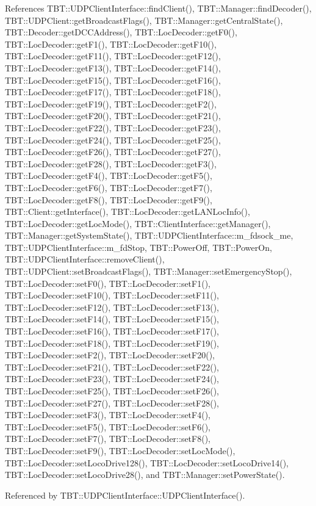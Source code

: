 References T\+B\+T\+::\+U\+D\+P\+Client\+Interface\+::find\+Client(), T\+B\+T\+::\+Manager\+::find\+Decoder(), T\+B\+T\+::\+U\+D\+P\+Client\+::get\+Broadcast\+Flags(), T\+B\+T\+::\+Manager\+::get\+Central\+State(), T\+B\+T\+::\+Decoder\+::get\+D\+C\+C\+Address(), T\+B\+T\+::\+Loc\+Decoder\+::get\+F0(), T\+B\+T\+::\+Loc\+Decoder\+::get\+F1(), T\+B\+T\+::\+Loc\+Decoder\+::get\+F10(), T\+B\+T\+::\+Loc\+Decoder\+::get\+F11(), T\+B\+T\+::\+Loc\+Decoder\+::get\+F12(), T\+B\+T\+::\+Loc\+Decoder\+::get\+F13(), T\+B\+T\+::\+Loc\+Decoder\+::get\+F14(), T\+B\+T\+::\+Loc\+Decoder\+::get\+F15(), T\+B\+T\+::\+Loc\+Decoder\+::get\+F16(), T\+B\+T\+::\+Loc\+Decoder\+::get\+F17(), T\+B\+T\+::\+Loc\+Decoder\+::get\+F18(), T\+B\+T\+::\+Loc\+Decoder\+::get\+F19(), T\+B\+T\+::\+Loc\+Decoder\+::get\+F2(), T\+B\+T\+::\+Loc\+Decoder\+::get\+F20(), T\+B\+T\+::\+Loc\+Decoder\+::get\+F21(), T\+B\+T\+::\+Loc\+Decoder\+::get\+F22(), T\+B\+T\+::\+Loc\+Decoder\+::get\+F23(), T\+B\+T\+::\+Loc\+Decoder\+::get\+F24(), T\+B\+T\+::\+Loc\+Decoder\+::get\+F25(), T\+B\+T\+::\+Loc\+Decoder\+::get\+F26(), T\+B\+T\+::\+Loc\+Decoder\+::get\+F27(), T\+B\+T\+::\+Loc\+Decoder\+::get\+F28(), T\+B\+T\+::\+Loc\+Decoder\+::get\+F3(), T\+B\+T\+::\+Loc\+Decoder\+::get\+F4(), T\+B\+T\+::\+Loc\+Decoder\+::get\+F5(), T\+B\+T\+::\+Loc\+Decoder\+::get\+F6(), T\+B\+T\+::\+Loc\+Decoder\+::get\+F7(), T\+B\+T\+::\+Loc\+Decoder\+::get\+F8(), T\+B\+T\+::\+Loc\+Decoder\+::get\+F9(), T\+B\+T\+::\+Client\+::get\+Interface(), T\+B\+T\+::\+Loc\+Decoder\+::get\+L\+A\+N\+Loc\+Info(), T\+B\+T\+::\+Loc\+Decoder\+::get\+Loc\+Mode(), T\+B\+T\+::\+Client\+Interface\+::get\+Manager(), T\+B\+T\+::\+Manager\+::get\+System\+State(), T\+B\+T\+::\+U\+D\+P\+Client\+Interface\+::m\+\_\+fdsock\+\_\+me, T\+B\+T\+::\+U\+D\+P\+Client\+Interface\+::m\+\_\+fd\+Stop, T\+B\+T\+::\+Power\+Off, T\+B\+T\+::\+Power\+On, T\+B\+T\+::\+U\+D\+P\+Client\+Interface\+::remove\+Client(), T\+B\+T\+::\+U\+D\+P\+Client\+::set\+Broadcast\+Flags(), T\+B\+T\+::\+Manager\+::set\+Emergency\+Stop(), T\+B\+T\+::\+Loc\+Decoder\+::set\+F0(), T\+B\+T\+::\+Loc\+Decoder\+::set\+F1(), T\+B\+T\+::\+Loc\+Decoder\+::set\+F10(), T\+B\+T\+::\+Loc\+Decoder\+::set\+F11(), T\+B\+T\+::\+Loc\+Decoder\+::set\+F12(), T\+B\+T\+::\+Loc\+Decoder\+::set\+F13(), T\+B\+T\+::\+Loc\+Decoder\+::set\+F14(), T\+B\+T\+::\+Loc\+Decoder\+::set\+F15(), T\+B\+T\+::\+Loc\+Decoder\+::set\+F16(), T\+B\+T\+::\+Loc\+Decoder\+::set\+F17(), T\+B\+T\+::\+Loc\+Decoder\+::set\+F18(), T\+B\+T\+::\+Loc\+Decoder\+::set\+F19(), T\+B\+T\+::\+Loc\+Decoder\+::set\+F2(), T\+B\+T\+::\+Loc\+Decoder\+::set\+F20(), T\+B\+T\+::\+Loc\+Decoder\+::set\+F21(), T\+B\+T\+::\+Loc\+Decoder\+::set\+F22(), T\+B\+T\+::\+Loc\+Decoder\+::set\+F23(), T\+B\+T\+::\+Loc\+Decoder\+::set\+F24(), T\+B\+T\+::\+Loc\+Decoder\+::set\+F25(), T\+B\+T\+::\+Loc\+Decoder\+::set\+F26(), T\+B\+T\+::\+Loc\+Decoder\+::set\+F27(), T\+B\+T\+::\+Loc\+Decoder\+::set\+F28(), T\+B\+T\+::\+Loc\+Decoder\+::set\+F3(), T\+B\+T\+::\+Loc\+Decoder\+::set\+F4(), T\+B\+T\+::\+Loc\+Decoder\+::set\+F5(), T\+B\+T\+::\+Loc\+Decoder\+::set\+F6(), T\+B\+T\+::\+Loc\+Decoder\+::set\+F7(), T\+B\+T\+::\+Loc\+Decoder\+::set\+F8(), T\+B\+T\+::\+Loc\+Decoder\+::set\+F9(), T\+B\+T\+::\+Loc\+Decoder\+::set\+Loc\+Mode(), T\+B\+T\+::\+Loc\+Decoder\+::set\+Loco\+Drive128(), T\+B\+T\+::\+Loc\+Decoder\+::set\+Loco\+Drive14(), T\+B\+T\+::\+Loc\+Decoder\+::set\+Loco\+Drive28(), and T\+B\+T\+::\+Manager\+::set\+Power\+State().



Referenced by T\+B\+T\+::\+U\+D\+P\+Client\+Interface\+::\+U\+D\+P\+Client\+Interface().

